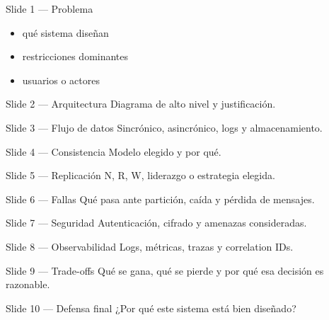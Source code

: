 \documentclass{ua-engineering-v6-beamer}
\title{\UACourse}
\subtitle{Template de defensa final}
\author{\UAProfessor}
\date{\UADate}
\begin{document}
\begin{frame}\titlepage\end{frame}
\begin{frame}{Slide 1 --- Problema}
\begin{itemize}
\item qué sistema diseñan
\item restricciones dominantes
\item usuarios o actores
\end{itemize}
\end{frame}
\begin{frame}{Slide 2 --- Arquitectura}
Diagrama de alto nivel y justificación.
\end{frame}
\begin{frame}{Slide 3 --- Flujo de datos}
Sincrónico, asincrónico, logs y almacenamiento.
\end{frame}
\begin{frame}{Slide 4 --- Consistencia}
Modelo elegido y por qué.
\end{frame}
\begin{frame}{Slide 5 --- Replicación}
N, R, W, liderazgo o estrategia elegida.
\end{frame}
\begin{frame}{Slide 6 --- Fallas}
Qué pasa ante partición, caída y pérdida de mensajes.
\end{frame}
\begin{frame}{Slide 7 --- Seguridad}
Autenticación, cifrado y amenazas consideradas.
\end{frame}
\begin{frame}{Slide 8 --- Observabilidad}
Logs, métricas, trazas y correlation IDs.
\end{frame}
\begin{frame}{Slide 9 --- Trade-offs}
Qué se gana, qué se pierde y por qué esa decisión es razonable.
\end{frame}
\begin{frame}{Slide 10 --- Defensa final}
¿Por qué este sistema está bien diseñado?
\end{frame}
\end{document}
